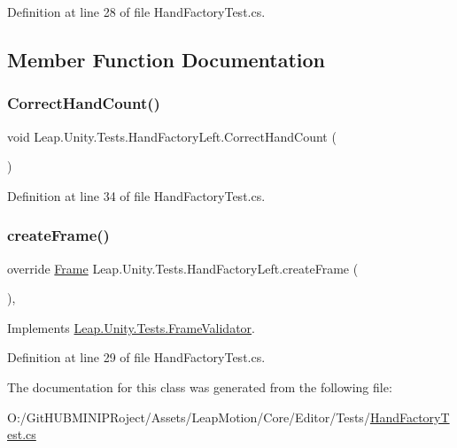 Definition at line 28 of file Hand\+Factory\+Test.\+cs.



\subsection{Member Function Documentation}
\mbox{\label{class_leap_1_1_unity_1_1_tests_1_1_hand_factory_left_a6783dd99b0fda3636aa43e7512ecf4dc}} 
\subsubsection{\texorpdfstring{CorrectHandCount()}{CorrectHandCount()}}
{\footnotesize\ttfamily void Leap.\+Unity.\+Tests.\+Hand\+Factory\+Left.\+Correct\+Hand\+Count (\begin{DoxyParamCaption}{ }\end{DoxyParamCaption})}



Definition at line 34 of file Hand\+Factory\+Test.\+cs.

\mbox{\label{class_leap_1_1_unity_1_1_tests_1_1_hand_factory_left_aee2926151ba99102d58cbefb2a029b06}} 
\subsubsection{\texorpdfstring{createFrame()}{createFrame()}}
{\footnotesize\ttfamily override \mbox{\hyperlink{class_leap_1_1_frame}{Frame}} Leap.\+Unity.\+Tests.\+Hand\+Factory\+Left.\+create\+Frame (\begin{DoxyParamCaption}{ }\end{DoxyParamCaption})\hspace{0.3cm}{\ttfamily [protected]}, {\ttfamily [virtual]}}



Implements \mbox{\hyperlink{class_leap_1_1_unity_1_1_tests_1_1_frame_validator_ae397067480c6fd2183160f048094e466}{Leap.\+Unity.\+Tests.\+Frame\+Validator}}.



Definition at line 29 of file Hand\+Factory\+Test.\+cs.



The documentation for this class was generated from the following file\+:\begin{DoxyCompactItemize}
\item 
O\+:/\+Git\+H\+U\+B\+M\+I\+N\+I\+P\+Roject/\+Assets/\+Leap\+Motion/\+Core/\+Editor/\+Tests/\mbox{\hyperlink{_hand_factory_test_8cs}{Hand\+Factory\+Test.\+cs}}\end{DoxyCompactItemize}
